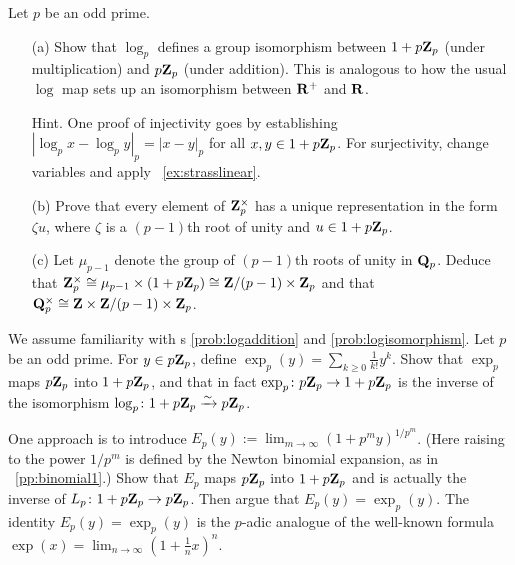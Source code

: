 \begin{challenge}\label{prob:logisomorphism} Let $p$ be an odd prime.
\vspace{-0.12in}
\begin{enumerate}
    \item[(a)] Show that $\log_p$ defines a group isomorphism between $1+p\mathbf{Z}_p$ (under multiplication) and $p\mathbf{Z}_p$ (under addition). This is analogous to how the usual $\log$ map sets up an isomorphism between $\mathbf{R}^{+}$ and $\mathbf{R}$.

{\scriptsize Hint. One proof of injectivity goes by establishing $|\log_p x - \log_p y|_p = |x-y|_p$ for all $x,y \in 1+p\mathbf{Z}_p$. For surjectivity, change variables and apply \pp~\ref{ex:strasslinear}.} 
\item[(b)] Prove that every element of $\mathbf{Z}_p^{\times}$ has a unique representation in the form $\zeta u$, where $\zeta$ is a $(p-1)$th root of unity and $u \in 1+p\mathbf{Z}_p$.
\item[(c)] Let $\mu_{p-1}$ denote the group of $(p-1)$th roots of unity in $\mathbf{Q}_p$. Deduce that $\mathbf{Z}_p^{\times} \cong \mu_{p-1} \times (1+p\mathbf{Z}_p) \cong \mathbf{Z}/({p-1}) \times \mathbf{Z}_p$ and that $\mathbf{Q}_p^{\times} \cong \mathbf{Z} \times \mathbf{Z}/(p-1) \times \mathbf{Z}_p$.
\end{enumerate}
\end{challenge}


\begin{challenge} We assume familiarity with \pp s \ref{prob:logaddition} and \ref{prob:logisomorphism}. Let $p$ be an odd prime. For $y \in p\mathbf{Z}_p$, define $\exp_p(y) = \sum_{k \ge 0}\frac{1}{k!} y^k$. Show that $\exp_p$ maps $p\mathbf{Z}_p$ into $1+p\mathbf{Z}_p$, and that in fact $\exp_p\colon p\mathbf{Z}_p\to 1+p\mathbf{Z}_p$ is the inverse of the isomorphism $\log_p\colon 1+p\mathbf{Z}_p  \xrightarrow{\sim} p\mathbf{Z}_p$. 

One approach is to introduce $E_p(y) := \lim_{m\to\infty} (1+p^m y)^{1/p^m}$. (Here raising to the power $1/p^m$ is defined by the Newton binomial expansion, as in \pp~\ref{pp:binomial1}.) Show that $E_p$ maps $p\mathbf{Z}_p$ into $1+p\mathbf{Z}_p$ and is actually the inverse of $L_p\colon 1+p\mathbf{Z}_p\to p\mathbf{Z}_p$. Then argue that $E_p(y) = \exp_p(y)$. The identity $E_p(y) = \exp_p(y)$ is the $p$-adic analogue of the well-known formula $\exp(x) = \lim_{n\to\infty} (1+\frac{1}{n}x)^{n}$.
\end{challenge}

